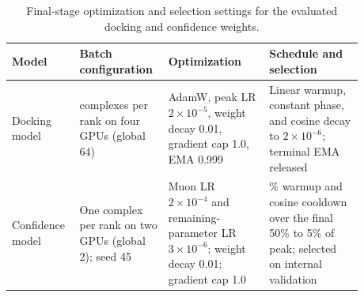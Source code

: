 \documentclass{article}
\newcommand{\citep}[1]{\cite{#1}}
\begin{document}
\begin{table}[htbp]
    \centering
    \small
    \caption{Final-stage optimization and selection settings for the evaluated docking and confidence weights.}
    \label{tab:si_training_schedule}
    \begin{tabular}{>{\raggedright\arraybackslash}p{0.16\linewidth}>{\raggedright\arraybackslash}p{0.20\linewidth}>{\raggedright\arraybackslash}p{0.27\linewidth}>{\raggedright\arraybackslash}p{0.25\linewidth}}
        \toprule
        Model & Batch configuration & Optimization & Schedule and selection \\
        \midrule
        Docking model & 16 complexes per rank on four GPUs (global 64) & AdamW, peak LR $2\times10^{-5}$, weight decay 0.01, gradient cap 1.0, EMA 0.999 & Linear warmup, constant phase, and cosine decay to $2\times10^{-6}$; terminal EMA released \\
        Confidence model & One complex per rank on two GPUs (global 2); seed 45 & Muon \citep{jordan2024muon} LR $2\times10^{-4}$ and remaining-parameter LR $3\times10^{-6}$; weight decay 0.01; gradient cap 1.0 & 2\% warmup and cosine cooldown over the final 50\% to 5\% of peak; selected on internal validation \\
        \bottomrule
    \end{tabular}
\end{table}
\end{document}

